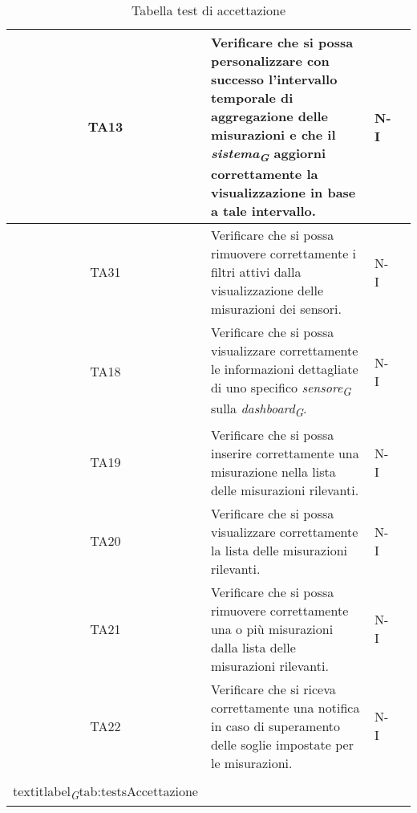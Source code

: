 \begin{longtable}{|c|p{5cm}|p{2cm}|c|}
    \hline
    TA13 & Verificare che si possa personalizzare con successo l'intervallo temporale di aggregazione delle misurazioni e che il \textit{sistema}\textsubscript{\textit{G}} aggiorni correttamente la visualizzazione in base a tale intervallo. & N-I \\
    \hline
    TA31 & Verificare che si possa rimuovere correttamente i filtri attivi dalla visualizzazione delle misurazioni dei sensori. & N-I \\
    \hline
    TA18 & Verificare che si possa visualizzare correttamente le informazioni dettagliate di uno specifico \textit{sensore}\textsubscript{\textit{G}} sulla \textit{dashboard}\textsubscript{\textit{G}}. & N-I \\
    \hline
    TA19 & Verificare che si possa inserire correttamente una misurazione nella lista delle misurazioni rilevanti. & N-I \\
    \hline
    TA20 & Verificare che si possa visualizzare correttamente la lista delle misurazioni rilevanti. & N-I \\
    \hline
    TA21 & Verificare che si possa rimuovere correttamente una o più misurazioni dalla lista delle misurazioni rilevanti. & N-I \\
    \hline
    TA22 & Verificare che si riceva correttamente una notifica in caso di superamento delle soglie impostate per le misurazioni.
    & N-I \\
    \hline
    \caption{Tabella test di accettazione}
    \\textit{label}\textsubscript{\textit{G}}{tab:testsAccettazione}
    \end{longtable}




